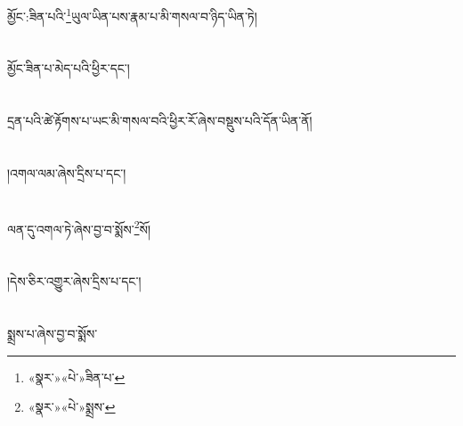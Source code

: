 མྱོང་:ཟིན་པའི་\footnote{«སྣར་»«པེ་»ཟིན་པ་}ཡུལ་ཡིན་པས་རྣམ་པ་མི་གསལ་བ་ཉིད་ཡིན་ཏེ།\chapter{ }མྱོང་ཟིན་པ་མེད་པའི་ཕྱིར་དང་།\chapter{ }དྲན་པའི་ཚེ་རྟོགས་པ་ཡང་མི་གསལ་བའི་ཕྱིར་རོ་ཞེས་བསྡུས་པའི་དོན་ཡིན་ནོ།\chapter{ }།འགལ་ལམ་ཞེས་དྲིས་པ་དང་།\chapter{ }ལན་དུ་འགལ་ཏེ་ཞེས་བྱ་བ་སྨོས་\footnote{«སྣར་»«པེ་»སྨྲས་}སོ།\chapter{ }།དེས་ཅིར་འགྱུར་ཞེས་དྲིས་པ་དང་།\chapter{ }སྨྲས་པ་ཞེས་བྱ་བ་སྨོས་\footn